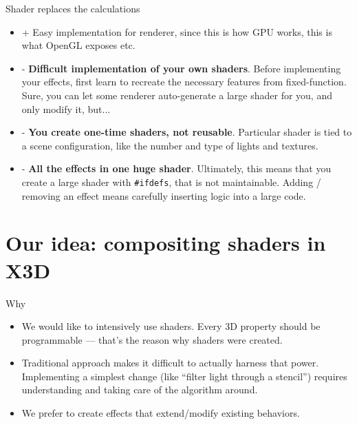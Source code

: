 \documentclass{beamer}
\begin{document}
\begin{frame}{Shader replaces the calculations}

\begin{itemize}
  \item + Easy implementation for renderer, since this is how GPU works,
    this is what OpenGL exposes etc.
  \item - \textbf{Difficult implementation of your own shaders}.
    Before implementing your effects, first learn to recreate
    the necessary features from fixed-function.
    Sure, you can let some renderer auto-generate a large shader for you,
    and only modify it, but...
  \item - \textbf{You create one-time shaders, not reusable}.
    Particular shader is tied to a scene configuration,
    like the number and type of lights and textures.
  \item - \textbf{All the effects in one huge shader}.
    Ultimately, this means that you create a large shader with \texttt{\#ifdefs},
    that is not maintainable. Adding / removing an effect means carefully
    inserting logic into a large code.
\end{itemize}
\end{frame}

\section[Our idea]{Our idea: compositing shaders in X3D}

\begin{frame}{Why}
\begin{itemize}
  \item We would like to intensively use shaders. Every 3D property
    should be programmable --- that's the reason why shaders were created.

  \item Traditional approach
    makes it difficult to actually harness that power.
    Implementing a simplest change (like ``filter light through a stencil'')
    requires understanding and taking care of the algorithm around.

  \item We prefer to create effects that extend/modify existing behaviors.
\end{itemize}
\end{frame}
\end{document}
